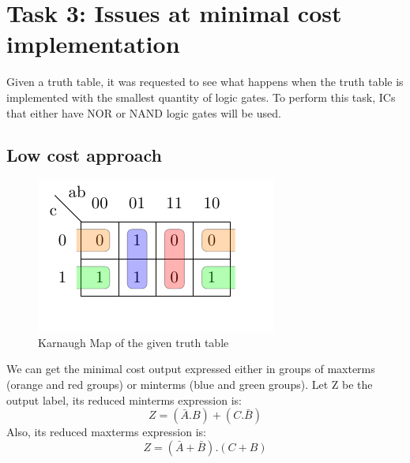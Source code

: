 \documentclass[a4paper,12pt]{article}
\begin{document}
\section*{Task 3: Issues at minimal cost implementation}

Given a truth table, it was requested to see what happens
when the truth table is implemented with the smallest quantity of logic
gates. To perform this task, ICs that either have NOR 
or NAND logic gates will be used.

\subsection*{Low cost approach}
\begin{figure}[htbp]
    \begin{center}
    \includegraphics{karnaugh.pdf}
    
    \end{center}
    
    \caption{Karnaugh Map of the given truth table}
    \label{fig:KarnaughMap}
    \end{figure}
We can get the minimal cost output expressed either in groups of 
maxterms (orange and red groups) or minterms (blue and green groups).
\linebreak
Let Z be the output label, its reduced minterms expression is:
\begin{equation}
    Z= (\bar{A}.B)+(C.\bar{B})
\end{equation} 
Also, its reduced maxterms expression is:
\begin{equation}
    Z= (\bar{A}+\bar{B}).(C+B)
\end{equation} 
\end{document}
